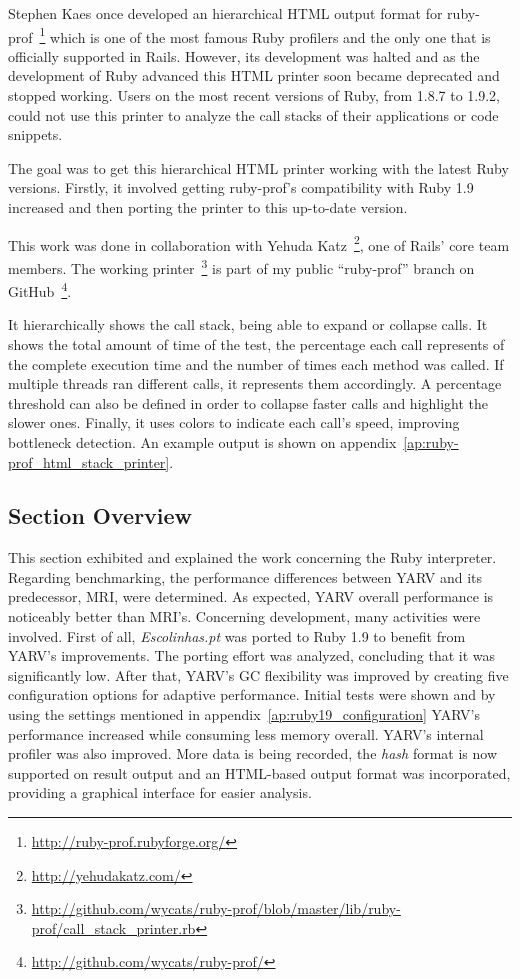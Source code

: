 Stephen Kaes once developed an hierarchical HTML output format for ruby-prof~\footnote{\url{http://ruby-prof.rubyforge.org/}} which is one of the most famous Ruby profilers and the only one that is officially supported in Rails. However, its development was halted and as the development of Ruby advanced this HTML printer soon became deprecated and stopped working. Users on the most recent versions of Ruby, from 1.8.7 to 1.9.2, could not use this printer to analyze the call stacks of their applications or code snippets.

The goal was to get this hierarchical HTML printer working with the latest Ruby versions. Firstly, it involved getting ruby-prof's compatibility with Ruby 1.9 increased and then porting the printer to this up-to-date version.

This work was done in collaboration with Yehuda Katz~\footnote{\url{http://yehudakatz.com/}}, one of Rails' core team members. The working printer~\footnote{\url{http://github.com/wycats/ruby-prof/blob/master/lib/ruby-prof/call_stack_printer.rb}} is part of my public ``ruby-prof'' branch on GitHub~\footnote{\url{http://github.com/wycats/ruby-prof/}}.

It hierarchically shows the call stack, being able to expand or collapse calls. It shows the total amount of time of the test, the percentage each call represents of the complete execution time and the number of times each method was called. If multiple threads ran different calls, it represents them accordingly. A percentage threshold can also be defined in order to collapse faster calls and highlight the slower ones. Finally, it uses colors to indicate each call's speed, improving bottleneck detection. An example output is shown on appendix~\ref{ap:ruby-prof_html_stack_printer}.


\subsection{Section Overview}
This section exhibited and explained the work concerning the Ruby interpreter. Regarding benchmarking, the performance differences between YARV and its predecessor, MRI, were determined. As expected, YARV overall performance is noticeably better than MRI's. Concerning development, many activities were involved. First of all, \textit{Escolinhas.pt} was ported to Ruby 1.9 to benefit from YARV's improvements. The porting effort was analyzed, concluding that it was significantly low. After that, YARV's GC flexibility was improved by creating five configuration options for adaptive performance. Initial tests were shown and by using the settings mentioned in appendix~\ref{ap:ruby19_configuration} YARV's performance increased while consuming less memory overall. YARV's internal profiler was also improved. More data is being recorded, the \textit{hash} format is now supported on result output and an HTML-based output format was incorporated, providing a graphical interface for easier analysis.

